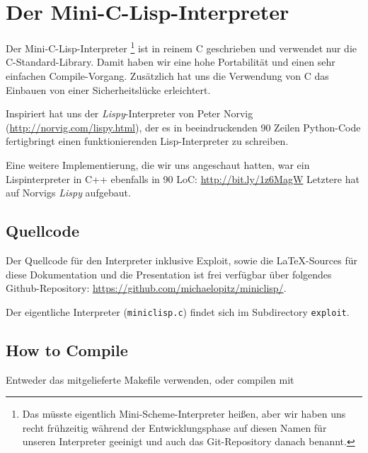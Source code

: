 \section[Mini-C-Lisp]{Der Mini-C-Lisp-Interpreter}
Der Mini-C-Lisp-Interpreter
\footnote{Das müsste eigentlich Mini-Scheme-Interpreter heißen, aber wir
haben uns recht frühzeitig während der Entwicklungsphase auf diesen Namen
für unseren Interpreter geeinigt und auch das Git-Repository danach benannt.
}
ist in reinem C geschrieben und verwendet nur die
C-Standard-Library. Damit haben wir eine hohe Portabilität und einen sehr
einfachen Compile-Vorgang. Zusätzlich hat uns die Verwendung von C das Einbauen
von einer Sicherheitslücke erleichtert.
\par
\label{lispy}
Inspiriert hat uns der \emph{Lispy}-Interpreter von Peter Norvig
(\url{http://norvig.com/lispy.html}), der es in beeindruckenden 90 Zeilen Python-Code
fertigbringt einen funktionierenden Lisp-Interpreter zu schreiben.
\par
Eine weitere Implementierung, die wir uns angeschaut hatten, war ein 
Lispinterpreter in C++ ebenfalls in 90 LoC:
\url{http://bit.ly/1z6MagW} Letztere hat auf Norvigs \emph{Lispy} aufgebaut.

\subsection[Quellcode]{Quellcode}
Der Quellcode für den Interpreter inklusive Exploit, sowie die \LaTeX-Sources
für diese Dokumentation und die Presentation ist frei verfügbar 
über folgendes Github-Repository: 
\url{https://github.com/michaelopitz/miniclisp/}.
\par
Der eigentliche Interpreter (\texttt{miniclisp.c}) findet sich im Subdirectory
\texttt{exploit}.
\par

\subsection[Compiling]{How to Compile}
Entweder das mitgelieferte Makefile verwenden, oder compilen mit



